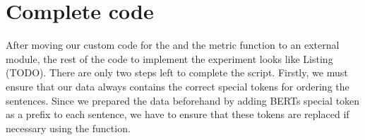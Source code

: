 \documentclass[letterpaper,10pt,english]{jupyterBook}
\begin{document}
\section{Complete code}
\label{\detokenize{HuggingFaceTrainer:complete-code}}
\sphinxAtStartPar
After moving our custom code for the  and the metric function to an external module, the rest of the code to implement the experiment looks like Listing (TODO).
There are only two steps left to complete the script.
Firstly, we must ensure that our data always contains the correct special tokens for ordering the sentences.
Since we prepared the data beforehand by adding BERTs special \sphinxcode{\sphinxupquote{{[}SEP{]}}}\sphinxhyphen{}token as a prefix to each sentence, we have to ensure that these tokens are replaced if necessary using the   function.
\end{document}
